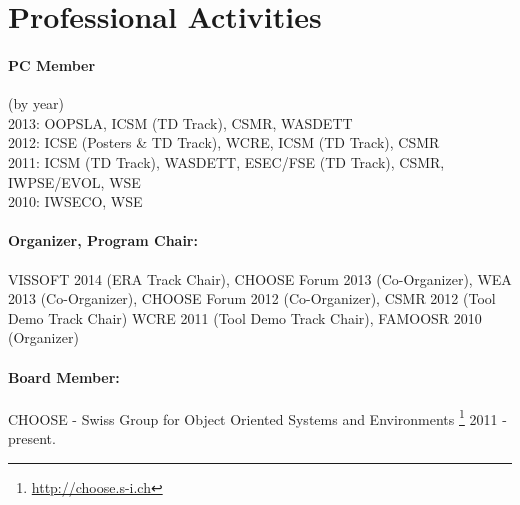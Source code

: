\documentclass[a4paper]{article}
\newcommand{\longcv}[1]{#1}
\newcommand{\shortcv}[1]{}
\newcommand{\longcv}[1]{}
\newcommand{\shortcv}[1]{#1}
\begin{document}
\longcv{\section{Professional Activities}}
\shortcv{\section{Selected Professional Activities}}

\shortcv{
\paragraph{Journal Reviewer:}
Journal of Software Maintenance and Evolution, %
Empirical Software Engineering, %
Elsevier Journal of Systems and Software,
Elsevier Science of Computer Programming, %
Foundations and Trends in Human Computer Interaction %
}

\longcv{
}

\paragraph{PC Member} 
(by year) \\
2013: OOPSLA, ICSM (TD Track), CSMR, WASDETT \\
2012: ICSE (Posters \& TD Track), WCRE, ICSM (TD Track), CSMR \\
2011: ICSM (TD Track), WASDETT, ESEC/FSE (TD Track), CSMR, IWPSE/EVOL, WSE  \\
2010: IWSECO, WSE

\paragraph{Organizer, Program Chair:}
VISSOFT 2014 (ERA Track Chair),
CHOOSE Forum 2013 (Co-Organizer),
WEA 2013 (Co-Organizer),
CHOOSE Forum 2012 (Co-Organizer),
CSMR 2012 (Tool Demo Track Chair)
WCRE 2011 (Tool Demo Track Chair), 
FAMOOSR 2010 (Organizer)

\paragraph{Board Member:}
CHOOSE - Swiss Group for Object Oriented Systems and Environments \footnote{\url{http://choose.s-i.ch}} 2011 - present.
\end{document}
